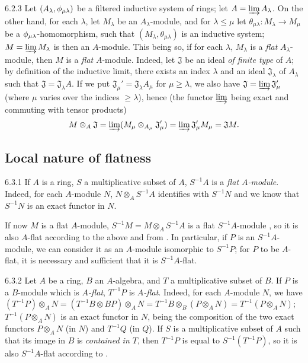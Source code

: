 \begin{env}{6.2.3}
\label{env-0.6.2.3}
Let $(A_\lambda,\phi_{\mu\lambda})$ be a filtered inductive system of rings;
let $A=\varinjlim A_\lambda$. On the other hand, for each $\lambda$, let
$M_\lambda$ be an $A_\lambda$-module, and for $\lambda\leqslant\mu$ let
$\theta_{\mu\lambda}:M_\lambda\to M_\mu$ be a $\phi_{\mu\lambda}$-homomorphism,
such that $(M_\lambda,\theta_{\mu\lambda})$ is an inductive system;
$M=\varinjlim M_\lambda$ is then an $A$-module. This being so, if for each
$\lambda$, $M_\lambda$ is a \emph{flat} $A_\lambda$-module, then $M$ is a
\emph{flat} $A$-module. Indeed, let $\mathfrak{J}$ be an ideal \emph{of finite
type} of $A$; by definition of the inductive limit, there exists an index
$\lambda$ and an ideal $\mathfrak{J}_\lambda$ of $A_\lambda$ such that
$\mathfrak{J}=\mathfrak{J}_\lambda A$. If we put
$\mathfrak{J}_\mu'=\mathfrak{J}_\lambda A_\mu$ for $\mu\geqslant\lambda$, we
also have $\mathfrak{J}=\varinjlim\mathfrak{J}_\mu'$ (where $\mu$ varies over
the indices $\geqslant\lambda$), hence (the functor $\varinjlim$ being exact and
commuting with tensor products)
\[
  M\otimes_A\mathfrak{J}=\varinjlim(M_\mu\otimes_{A_\mu}\mathfrak{J}_\mu')
  =\varinjlim\mathfrak{J}_\mu'M_\mu=\mathfrak{J}M.
\]
\end{env}

\subsection{Local nature of flatness}
\label{0-prelim-6.3}

\begin{env}{6.3.1}
\label{env-0.6.3.1}
If $A$ is a ring, $S$ a multiplicative subset of $A$, $S^{-1}A$ is a \emph{flat
$A$-module}. Indeed, for each $A$-module $N$, $N\otimes_A S^{-1}A$ identifies
with $S^{-1}N$  and we know  that $S^{-1}N$ is
an exact functor in $N$.

If now $M$ is a flat $A$-module, $S^{-1}M=M\otimes_A S^{-1}A$ is a flat
$S^{-1}A$-module , so it is also $A$-flat according to the
above and from . In particular, if $P$ is an $S^{-1}A$-module,
we can consider it as an $A$-module isomorphic to $S^{-1}P$; for $P$ to be
$A$-flat, it is necessary and sufficient that it is $S^{-1}A$-flat.
\end{env}

\begin{env}{6.3.2}
\label{env-0.6.3.2}
Let $A$ be a ring, $B$ an $A$-algebra, and $T$ a multiplicative subset of $B$.
If $P$ is a $B$-module which is \emph{$A$-flat}, $T^{-1}P$ is \emph{$A$-flat}.
Indeed, for each $A$-module $N$, we have
$(T^{-1}P)\otimes_A N=(T^{-1}B\otimes B P)\otimes_A N
  =T^{-1}B\otimes_B(P\otimes_A N)
  =T^{-1}(P\otimes_A N)$; $T^{-1}(P\otimes_A N)$ is an exact functor in $N$,
being the composition of the two exact functors $P\otimes_A N$ (in $N$) and
$T^{-1}Q$ (in $Q$). If $S$ is a multiplicative subset of $A$ such that its image
in $B$ is \emph{contained in $T$}, then $T^{-1}P$ is equal to $S^{-1}(T^{-1}P)$,
so it is also $S^{-1}A$-flat according to .
\end{env}


